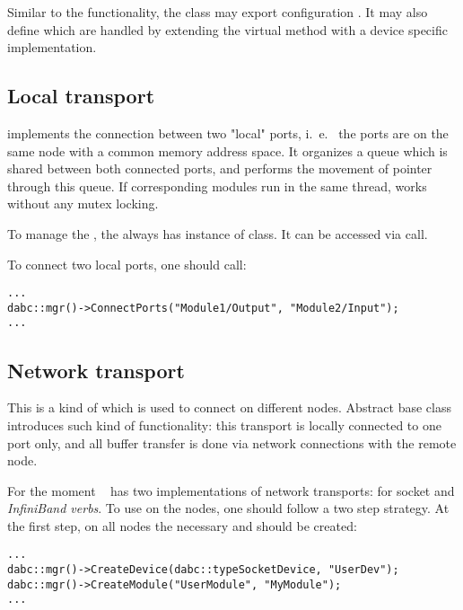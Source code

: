 Similar to the  functionality, the  class
may export configuration . It may also 
define  which are handled by extending the
virtual method  with a device specific
implementation.      
      

\subsection{Local transport}

 implements
the connection between two "local" ports,
i.~e.~ the ports are on the same node with a common memory address space.
It organizes a queue which is shared between both connected ports,
and performs the movement of  pointer through this queue.
If corresponding modules run in the same thread, 
 works without any mutex locking.

To manage the , the  always has instance of  class.
It can be accessed via  call. 

To connect two local ports, one should call:
\begin{small}
\begin{verbatim}
...
dabc::mgr()->ConnectPorts("Module1/Output", "Module2/Input");
...
\end{verbatim}     
\end{small}


\subsection{Network transport}

This is a kind of  which is used to 
connect  on different nodes.
Abstract base class  introduces such kind of 
functionality: this transport is locally connected  to one port only, 
and all buffer transfer is done
via network connections with the remote node. 

For the moment \dabc~ has two implementations of network transports: 
for socket and {\em InfiniBand verbs}.
To use  on the nodes, one should follow a two step strategy. 
At the first step, on all nodes the necessary  and  
should be created:
\begin{small}
\begin{verbatim}
...
dabc::mgr()->CreateDevice(dabc::typeSocketDevice, "UserDev");
dabc::mgr()->CreateModule("UserModule", "MyModule");
...
\end{verbatim}     
\end{small}

